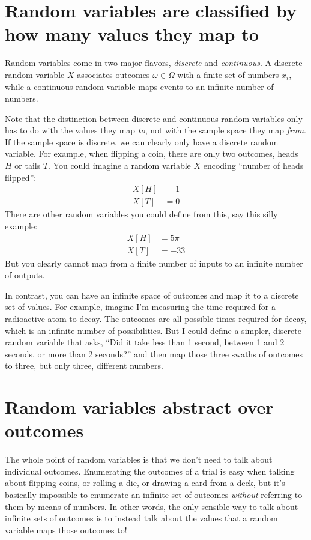\section{Random variables are classified by how many values they map to}

Random variables come in two major flavors, \emph{discrete} and
\emph{continuous}. A discrete random variable $X$ associates outcomes
$\omega \in \Omega$ with a finite set of numbers $x_i$, while a continuous
random variable maps events to an infinite number of numbers.

Note that the distinction between discrete and continuous random variables only
has to do with the values they map \emph{to}, not with the sample space they
map \emph{from}. If the sample space is discrete, we can clearly only have a
discrete random variable. For example, when flipping a coin, there are only two
outcomes, heads $H$ or tails $T$. You could imagine a random variable $X$
encoding ``number of heads flipped'':
\begin{align*}
X[H] &= 1 \\
X[T] &= 0
\end{align*}
There are other random variables you could define from this, say this silly example:
\begin{align*}
X[H] &= 5\pi \\
X[T] &= -33
\end{align*}
But you clearly cannot map from a finite number of inputs to an infinite number
of outputs.

In contrast, you can have an infinite space of outcomes and map it to a
discrete set of values. For example, imagine I'm measuring the time required for
a radioactive atom to decay. The outcomes are all possible times required for
decay, which is an infinite number of possibilities. But I could define a simpler,
discrete random variable that asks, ``Did it take less than 1 second, between 1
and 2 seconds, or more than 2 seconds?'' and then map those three swaths of outcomes
to three, but only three, different numbers.


\section{Random variables abstract over outcomes}

The whole point of random variables is that we don't need to talk about
individual outcomes. Enumerating the outcomes of a trial is easy when talking
about flipping
coins, or rolling a die, or drawing a card from a deck, but it's basically
impossible to enumerate an infinite set of outcomes \emph{without} referring to
them by means of numbers. In other words, the only sensible way to talk about
infinite sets of outcomes is to instead talk about the values that a random variable
maps those outcomes to!

